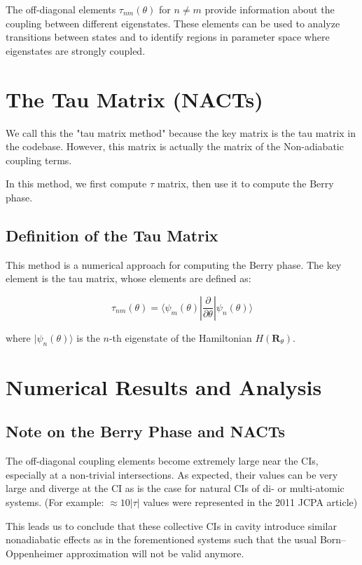 \documentclass{article}
\begin{document}
The off-diagonal elements $\tau_{nm}(\theta)$ for $n \neq m$ provide information about the coupling between different eigenstates. These elements can be used to analyze transitions between states and to identify regions in parameter space where eigenstates are strongly coupled.


\section{The Tau Matrix (NACTs)}

We call this the "tau matrix method" because the key matrix is the tau matrix in the codebase. However, this matrix is actually the matrix of the Non-adiabatic coupling terms.

In this method, we first compute $\tau$ matrix, then use it to compute the Berry phase.

\subsection{Definition of the Tau Matrix}

This method is a numerical approach for computing the Berry phase. The key element is the tau matrix, whose elements are defined as:

\begin{equation}
\tau_{nm}(\theta) = \langle \psi_m(\theta) | \frac{\partial}{\partial\theta} | \psi_n(\theta) \rangle
\end{equation}

where $|\psi_n(\theta)\rangle$ is the $n$-th eigenstate of the Hamiltonian $H(\bm{R}_\theta)$.

\section{Numerical Results and Analysis}

\subsection{Note on the Berry Phase and NACTs}

The off-diagonal coupling elements become extremely large near the CIs, especially at a non-trivial intersections. As expected, their values can be very large and diverge at the CI as is the case for natural CIs of di- or multi-atomic systems. (For example: $\approx 10 |\tau|$ values were represented in the 2011 JCPA article)


This leads us to conclude that these collective CIs in cavity introduce similar nonadiabatic effects as in the forementioned systems such that the usual Born–Oppenheimer approximation will not be valid anymore.
\end{document}
